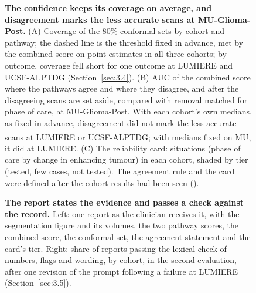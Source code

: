 \documentclass[largeformat]{interact} %
\newcommand{\expl}{\textsuperscript{\textdagger}}
\begin{document}
\begin{figure}[!htbp]
\centering
{}
\caption{\textbf{The confidence keeps its coverage on average, and disagreement marks the less accurate scans at
MU-Glioma-Post.} (A) Coverage of the 80\% conformal sets by cohort and pathway; the dashed line is the threshold fixed
in advance, met by the combined score on point estimates in all three cohorts; by outcome, coverage fell short for one outcome at
LUMIERE and UCSF-ALPTDG (Section~\ref{sec:3.4}). (B) AUC of the combined score where
the pathways agree and where they disagree, and after the disagreeing scans are set aside, compared with removal
matched for phase of care, at MU-Glioma-Post. With each cohort's own medians, as fixed in advance, disagreement did
not mark the less accurate scans at LUMIERE or UCSF-ALPTDG; with medians fixed on MU\expl, it did at LUMIERE. (C) The reliability card: situations (phase of care by change in enhancing tumour) in each
cohort, shaded by tier (tested, few cases, not tested). The agreement rule and the card were defined after the cohort results had been seen (\textdagger).}
\label{fig:4}
\end{figure}

\begin{figure}[!htbp]
\centering
{}
\caption{\textbf{The report states the evidence and passes a check against the record.} Left: one report as the clinician receives
it, with the segmentation figure and its volumes, the two pathway scores, the combined score, the conformal set, the
agreement statement and the card's tier. Right: share of reports passing the lexical check of numbers, flags and wording, by cohort, in the
second evaluation, after one revision of the prompt following a failure at LUMIERE (Section~\ref{sec:3.5}).}
\label{fig:5}
\end{figure}
\end{document}
